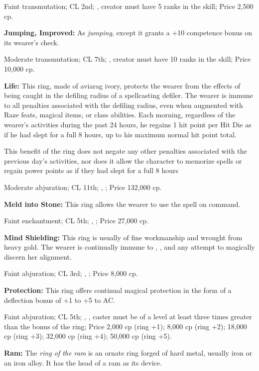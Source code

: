 Faint transmutation; CL 2nd; , creator must have 5 ranks in the  skill; Price 2,500 cp.


\textbf{Jumping, Improved:} As \emph{jumping}, except it grants a +10 competence bonus on its wearer's  check.

Moderate transmutation; CL 7th; , creator must have 10 ranks in the  skill; Price 10,000 cp.


\textbf{Life:} This ring, made of aviarag ivory, protects the wearer from the effects of being caught in the defiling radius of a spellcasting defiler. The wearer is immune to all penalties associated with the defiling radius, even when augmented with Raze feats, magical items, or class abilities. Each morning, regardless of the wearer's activities during the past 24 hours, he regains 1 hit point per Hit Die as if he had slept for a full 8 hours, up to his maximum normal hit point total.

This benefit of the ring does not negate any other penalties associated with the previous day's activities, nor does it allow the character to memorize spells or regain power points as if they had slept for a full 8 hours

Moderate abjuration; CL 11th; , ; Price 132,000 cp.


\textbf{Meld into Stone:} This ring allows the wearer to use the spell  on command.

Faint enchantment; CL 5th; , ; Price 27,000 cp.


\textbf{Mind Shielding:} This ring is usually of fine workmanship and wrought from heavy gold. The wearer is continually immune to , , and any attempt to magically discern her alignment.

Faint abjuration; CL 3rd; , ; Price 8,000 cp.


\textbf{Protection:} This ring offers continual magical protection in the form of a deflection bonus of +1 to +5 to AC.

Faint abjuration; CL 5th; , , caster must be of a level at least three times greater than the bonus of the ring; Price 2,000 cp (ring +1); 8,000 cp (ring +2); 18,000 cp (ring +3); 32,000 cp (ring +4); 50,000 cp (ring +5).


\textbf{Ram:} The \emph{ring of the ram} is an ornate ring forged of hard metal, usually iron or an iron alloy. It has the head of a ram as its device.

